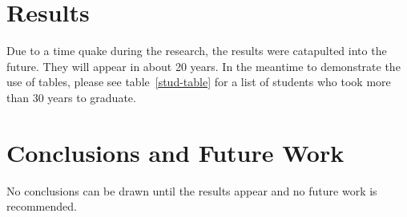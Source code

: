 \documentclass[11pt]{report}
\begin{document}
\chapter{Results}

Due to a time quake during the research, the results were catapulted into the future.  They will appear in about 20 years.
In the meantime to demonstrate the use of tables, please see table~\ref{stud-table} for a list of students who took more than 30 years to graduate.

\chapter{Conclusions and Future Work}
No conclusions can be drawn until the results appear and no future work is recommended.




\end{document}
